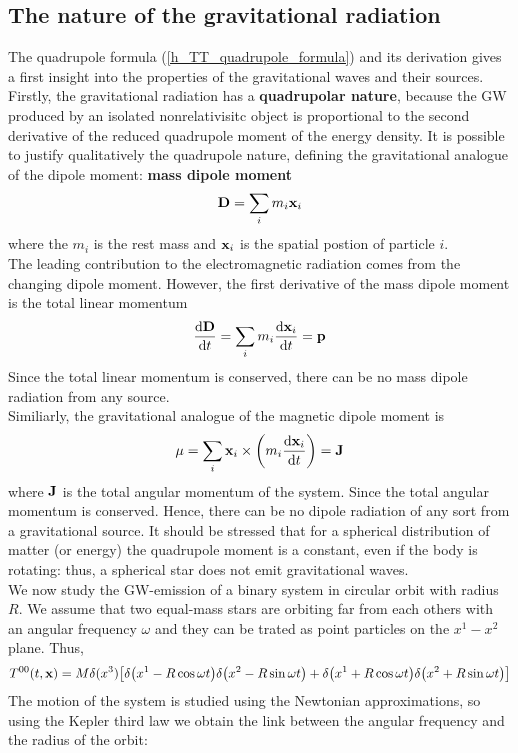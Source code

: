 \subsection{The nature of the gravitational radiation}
The quadrupole formula (\ref{h_TT_quadrupole_formula}) and its derivation gives a  first insight into the properties of the gravitational waves and their sources.\\
Firstly, the gravitational radiation has a \textbf{quadrupolar nature}, because the GW produced by an isolated nonrelativisitc object is proportional to the second derivative of the reduced quadrupole moment of the energy density. 
It is possible to justify qualitatively
the quadrupole nature, defining the gravitational analogue of the dipole moment: \textbf{mass dipole moment}
\begin{equation}
\label{mass_dipole_moment}
\vb{D} = \sum _{i} m_{i} \vb{x}_i
\end{equation}
where the $m_i$ is the rest mass and $\vb{x}_{i}$ is the spatial postion of particle $i$.\\
The leading contribution to the electromagnetic radiation comes from the changing dipole moment. 
However, the first derivative of the mass dipole moment is the total linear momentum
\[
\dv{\vb{D}}{t} = \sum _{i} m_i \dv{\vb{x}_i}{t} = \vb{p}
\]
Since the total linear momentum is conserved, there can be no mass dipole radiation from any source.\\
Similiarly, the gravitational analogue of the magnetic dipole moment is 
\[
\vb{\mu} = \sum_{i} \vb{x}_i \times \qty(m_i \dv{\vb{x}_i}{t}) =\vb{J}
\]
where $\vb{J}$ is the total angular momentum of the system. 
Since the total angular momentum is conserved. Hence, there can be no dipole radiation of any sort from a gravitational source.
It should be stressed that for a spherical  distribution of matter (or energy) the quadrupole moment is a constant, even if the body is rotating: thus, a spherical star does not emit gravitational waves.\\
We now study the GW-emission of a binary system in circular orbit with radius $R$.
We assume that two equal-mass stars are orbiting far from each others with an angular frequency $\omega$ and they can be trated as point particles on the $x^{1}-x^{2}$ plane. Thus,
\[
T^{00} (t,\vb{x}) = M \delta(x^{3}) \qty[
\delta\qty(x^{1}-R\cos \omega t)
\delta\qty(x^{2}-R\sin \omega t)
+
\delta\qty(x^{1}+R\cos \omega t)
\delta\qty(x^{2}+R\sin \omega t)
]
\]
The motion of the system is studied using the Newtonian approximations, so using the  Kepler third law we obtain the link between the angular frequency and the radius of the orbit:
